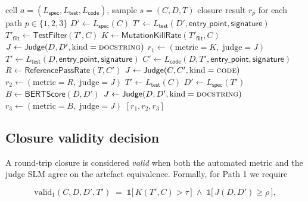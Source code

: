 \begin{algorithm}[h]
\caption{Round-trip closure path execution}
\label{alg:path_execution}
\begin{algorithmic}[1]
\Require cell $a = (L_{\textsf{spec}}, L_{\textsf{test}}, L_{\textsf{code}})$, sample $s = (C, D, T)$
\Ensure closure result $r_p$ for each path $p \in \{1, 2, 3\}$
   
    \State $D' \leftarrow L_{\textsf{spec}}(C)$
    \State $T' \leftarrow L_{\textsf{test}}(D', \textsf{entry\_point}, \textsf{signature})$
    \State $T'_{\textsf{filt}} \leftarrow \textsf{TestFilter}(T', C)$ 
    \State $K \leftarrow \textsf{MutationKillRate}(T'_{\textsf{filt}}, C)$
    \State $J \leftarrow \textsf{Judge}(D, D', \text{kind}=\textsc{docstring})$
    \State $r_1 \leftarrow (\text{metric}=K,\; \text{judge}=J)$
   
    \State $T' \leftarrow L_{\textsf{test}}(D, \textsf{entry\_point}, \textsf{signature})$
    \State $C' \leftarrow L_{\textsf{code}}(D, T', \textsf{entry\_point}, \textsf{signature})$
    \State $R \leftarrow \textsf{ReferencePassRate}(T, C')$
    \State $J \leftarrow \textsf{Judge}(C, C', \text{kind}=\textsc{code})$
    \State $r_2 \leftarrow (\text{metric}=R,\; \text{judge}=J)$
  \Else {}
    \State $T' \leftarrow L_{\textsf{test}}(C)$
    \State $D' \leftarrow L_{\textsf{spec}}(T')$
    \State $B \leftarrow \textsf{BERTScore}(D, D')$
    \State $J \leftarrow \textsf{Judge}(D, D', \text{kind}=\textsc{docstring})$
    \State $r_3 \leftarrow (\text{metric}=B,\; \text{judge}=J)$
  \EndIf
\EndFor
\State \Return $[r_1, r_2, r_3]$
\end{algorithmic}
\end{algorithm}

\subsection{Closure validity decision}

A round-trip closure is considered \emph{valid} when both the automated metric and the judge SLM agree on the artefact equivalence. Formally, for Path 1 we require

\begin{equation}
  \text{valid}_1(C, D, D', T')
  \;=\;
  \mathds{1}\!\bigl[\, K(T', C) > \tau \,\bigr]
  \;\wedge\;
  \mathds{1}\!\bigl[\, J(D, D') \geq \rho \,\bigr],
  \label{eq:valid1}
\end{equation}

